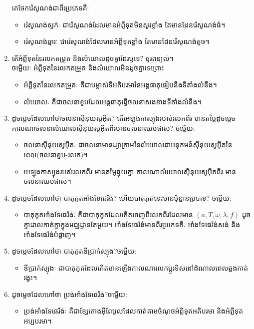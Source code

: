\documentclass{officialexam}
\begin{document}
\begin{enumerate}[m]
		គេចែករ៉េសូណង់ជាពីរប្រភេទគឺៈ
		\begin{itemize}
			\item រ៉េសូណង់ស្ទក់ៈ ជារ៉េសូណង់ដែលមានអំព្លីទុតមិនសូវខ្លាំង តែមានដែនរ៉េសូណង់ធំ។
			\item រ៉េសូណង់ឆ្មារៈ ជារ៉េសូណង់ដែលមានអំព្លីទុតខ្លាំង តែមានដែនរ៉េសូណង់តូច។	
		\end{itemize}
		\item តើអំព្លីទុតនៃរលកតម្រួត និងលំយោលដូចគ្នាដែរឬទេ? ចូរពន្យល់។\\
		{\color{red}\sffamily ចម្លើយ}: អំព្លីទុតនៃរលកតម្រួត និងលំយោលមិនដូចគ្នាទេព្រោះ
		\begin{itemize}
			\item អំព្លីទុតនៃរលកតម្រួតៈ គឺជាបម្លាស់ទីអតិបរមានៃអង្គធាតុធៀបនឹងទីតាំងលំនឹង។
			\item លំយោលៈ គឺជាចលនាខួបដែលអង្គធាតុធ្វើចលនាសងខាងទីតាំងលំនឹង។
		\end{itemize}
		\item ដូចម្តេចដែលហៅថាចលនាសុីនុយសូអុីត? តើអេ​ឡុង​កាស្យុងរបស់រលកពីរ មានតម្លៃដូចម្តេចកាលណាចលនាលំយោលសុីនុយសូអុីតពីរមានចលនាឈមផាស?
		{\color{red}\sffamily ចម្លើយ}:
		\begin{itemize}
			\item ចលនាសុីនុយសូអុីតៈ ជាចលនាមានដ្យាក្រាមនៃលំយោលជាអនុគមន៍សុីនុយសូអុីតនៃពេល(ចលនាខួប-រលក)។
			\item អេឡុងកាស្យុងរបស់រលកពីរ មានតម្លៃផ្ទុយគ្នា កាលណាលំយោលសុីនុយសូអុីតពីរ មានចលនាឈមផាស។
		\end{itemize}
		\item ដូចម្តេចដែលហៅថា បាតុភូតអាំងទែផេរ៉ង់? ហើយបាតុភូតនេះមានប៉ុន្មានប្រភេទ? {\color{red}\sffamily ចម្លើយ}:
		\begin{itemize}
			\item បាតុភូតអាំងទែផេរ៉ង់ៈ គឺជាបាតុភូតដែលកើតចេញពីរលកពីរដែលមាន $\left(a,T,\omega, \lambda, f\right)$ ដូចគ្នាដាលកាត់គ្នាក្នុងមជ្ឈដ្ឋានតែមួយ។ អាំងទែផេរ៉ង់មានពីរប្រភេទគឺៈ អាំងទែផេរ៉ង់សង់ និងអាំងទែផេរ៉ង់បំផ្លាញ។​
		\end{itemize}
		\item ដូចម្តេចដែលហៅថា បាតុភូតឌីប្រាក់ស្យុង?​{\color{red}\sffamily ចម្លើយ}:
		\begin{itemize}
			\item ឌីប្រាក់ស្យុងៈ ជាបាតុភូតដែលកើតមានឡើងកាលណារលកប្តូរទិសដៅដំណាលពេលឆ្លងកាត់រង្វះ។
		\end{itemize}
		\item ដូចម្តេចដែលហៅថា ប្រង់អាំងទែផេរ៉ង់?{\color{red}\sffamily ចម្លើយ}:
		\begin{itemize}
			\item ប្រង់អាំងទែផេរ៉ង់ៈ គឺជាខ្សែកោងអុីពែបូលដែលកាត់តាមចំណុចអំព្លីទុតអតិបរមា និងអំព្លីទុតអប្បបរមា។

\end{itemize}
\end{enumerate}
\end{document}
